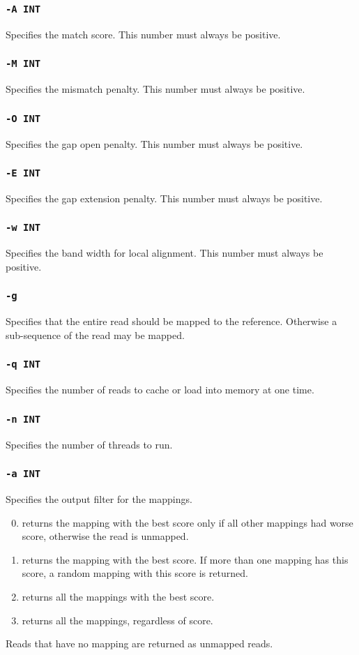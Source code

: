 \documentclass[a4paper,12pt]{book}
\newcommand{\TT}[1]{{\tt #1}} %
\begin{document}
\subsubsection{\TT{-A INT}}
Specifies the match score.
This number must always be positive.

\subsubsection{\TT{-M INT}}
Specifies the mismatch penalty.
This number must always be positive.

\subsubsection{\TT{-O INT}}
Specifies the gap open penalty.
This number must always be positive.

\subsubsection{\TT{-E INT}}
Specifies the gap extension penalty.
This number must always be positive.

\subsubsection{\TT{-w INT}}
Specifies the band width for local alignment.
This number must always be positive.

\subsubsection{\TT{-g}}
Specifies that the entire read should be mapped to the reference.
Otherwise a sub-sequence of the read may be mapped.
\subsubsection{\TT{-q INT}}
Specifies the number of reads to cache or load into memory at one time.

\subsubsection{\TT{-n INT}}
Specifies the number of threads to run.

\subsubsection{\TT{-a INT}}
Specifies the output filter for the mappings.
\begin{enumerate}
	\setcounter{enumi}{-1} %
	\item returns the mapping with the best score only if all other mappings had worse score, otherwise the read is unmapped.
	\item returns the mapping with the best score.  
		If more than one mapping has this score, a random mapping with this score is returned.
	\item returns all the mappings with the best score.
	\item returns all the mappings, regardless of score.
\end{enumerate}
Reads that have no mapping are returned as unmapped reads.
\end{document}
